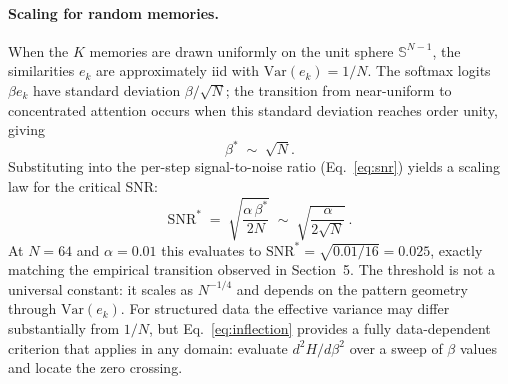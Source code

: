 \paragraph{Scaling for random memories.}
When the $K$ memories are drawn uniformly on the unit sphere $\mathbb{S}^{N-1}$, the similarities $e_k$ are approximately iid with $\mathrm{Var}(e_k)=1/N$. The softmax logits $\beta e_k$ have standard deviation $\beta/\sqrt{N}$; the transition from near-uniform to concentrated attention occurs when this standard deviation reaches order unity, giving
\begin{equation}\label{eq:beta-star-scaling}
\beta^{*} \;\sim\; \sqrt{N}.
\end{equation}
Substituting into the per-step signal-to-noise ratio (Eq.~\ref{eq:snr}) yields a scaling law for the critical SNR:
\begin{equation}\label{eq:snr-star}
\mathrm{SNR}^{*} \;=\; \sqrt{\frac{\alpha\,\beta^{*}}{2N}} \;\sim\; \sqrt{\frac{\alpha}{2\sqrt{N}}}\,.
\end{equation}
At $N{=}64$ and $\alpha{=}0.01$ this evaluates to $\mathrm{SNR}^{*}=\sqrt{0.01/16}=0.025$, exactly matching the empirical transition observed in Section~5. The threshold is not a universal constant: it scales as $N^{-1/4}$ and depends on the pattern geometry through $\mathrm{Var}(e_k)$. For structured data the effective variance may differ substantially from $1/N$, but Eq.~\eqref{eq:inflection} provides a fully data-dependent criterion that applies in any domain: evaluate $d^{2}H/d\beta^{2}$ over a sweep of $\beta$ values and locate the zero crossing.